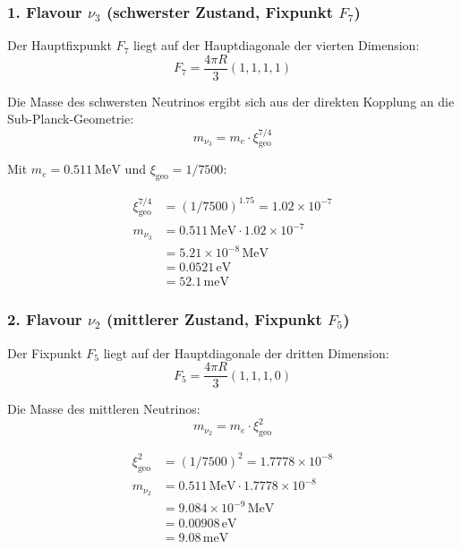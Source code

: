\documentclass[11pt,a4paper]{article}
\newcommand{\xigeo}{\xi_{\text{geo}}}
\begin{document}
	\subsubsection{1. Flavour $\nu_3$ (schwerster Zustand, Fixpunkt $F_7$)}
	
	Der Hauptfixpunkt $F_7$ liegt auf der Hauptdiagonale der vierten Dimension:
	\begin{equation}
		F_7 = \frac{4\pi R}{3}(1, 1, 1, 1)
	\end{equation}
	
	Die Masse des schwersten Neutrinos ergibt sich aus der direkten Kopplung an die Sub-Planck-Geometrie:
	\begin{equation}
		m_{\nu_3} = m_e \cdot \xigeo^{7/4}
	\end{equation}
	
	Mit $m_e = 0.511\,\text{MeV}$ und $\xigeo = 1/7500$:
	
	\begin{align}
		\xigeo^{7/4} &= (1/7500)^{1.75} = 1.02 \times 10^{-7} \\
		m_{\nu_3} &= 0.511\,\text{MeV} \cdot 1.02 \times 10^{-7} \\
		&= 5.21 \times 10^{-8}\,\text{MeV} \\
		&= 0.0521\,\text{eV} \\
		&= 52.1\,\text{meV}
	\end{align}
	
	\subsubsection{2. Flavour $\nu_2$ (mittlerer Zustand, Fixpunkt $F_5$)}
	
	Der Fixpunkt $F_5$ liegt auf der Hauptdiagonale der dritten Dimension:
	\begin{equation}
		F_5 = \frac{4\pi R}{3}(1, 1, 1, 0)
	\end{equation}
	
	Die Masse des mittleren Neutrinos:
	\begin{equation}
		m_{\nu_2} = m_e \cdot \xigeo^{2}
	\end{equation}
	
	\begin{align}
		\xigeo^{2} &= (1/7500)^2 = 1.7778 \times 10^{-8} \\
		m_{\nu_2} &= 0.511\,\text{MeV} \cdot 1.7778 \times 10^{-8} \\
		&= 9.084 \times 10^{-9}\,\text{MeV} \\
		&= 0.00908\,\text{eV} \\
		&= 9.08\,\text{meV}
	\end{align}
	
\end{document}
